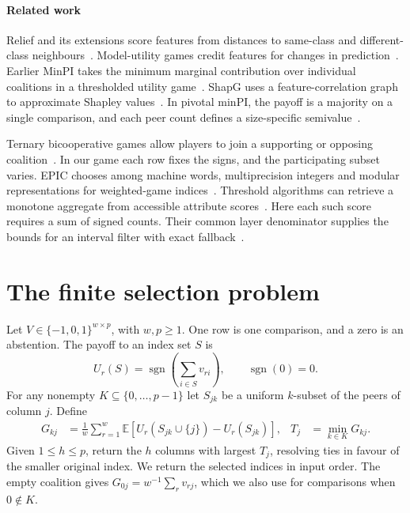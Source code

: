 \documentclass{article}
\DeclareMathOperator{\sgn}{sgn}
\newcommand{\EE}{\mathbb E}
\newcommand{\method}{pivotal minPI}
\begin{document}
\paragraph{Related work}
Relief and its extensions score features from distances to same-class and different-class neighbours~\citep{kira1992relief,robnik2003relieff,sun2010local}. Model-utility games credit features for changes in prediction~\citep{cohen2007feature}. Earlier MinPI takes the minimum marginal contribution over individual coalitions in a thresholded utility game~\citep{shi2026minpi}. ShapG uses a feature-correlation graph to approximate Shapley values~\citep{zhao2025shapg}. In \method{}, the payoff is a majority on a single comparison, and each peer count defines a size-specific semivalue~\citep{dubey1981semivalues}.

Ternary bicooperative games allow players to join a supporting or opposing coalition~\citep{bilbao2010ternary}. In our game each row fixes the signs, and the participating subset varies. EPIC chooses among machine words, multiprecision integers and modular representations for weighted-game indices~\citep{staudacher2021power}. Threshold algorithms can retrieve a monotone aggregate from accessible attribute scores~\citep{fagin2003topk}. Here each such score requires a sum of signed counts. Their common layer denominator supplies the bounds for an interval filter with exact fallback~\citep{shewchuk1997adaptive}.

\section{The finite selection problem}
Let $V\in\{-1,0,1\}^{w\times p}$, with $w,p\ge1$. One row is one comparison, and a zero is an abstention. The payoff to an index set $S$ is
\begin{equation}
 U_r(S)=\sgn\!\left(\sum_{i\in S}v_{ri}\right), \qquad \sgn(0)=0 .\label{eq:game}
\end{equation}
For any nonempty $K\subseteq\{0,\ldots,p-1\}$ let $S_{jk}$ be a uniform $k$-subset of the peers of column $j$. Define
\begin{align}
 G_{kj}&=\frac1w\sum_{r=1}^{w}\EE\!\left[U_r(S_{jk}\cup\{j\})-U_r(S_{jk})\right],
 & T_j&=\min_{k\in K}G_{kj} .\label{eq:score}
\end{align}
Given $1\le h\le p$, return the $h$ columns with largest $T_j$, resolving ties in favour of the smaller original index. We return the selected indices in input order. The empty coalition gives $G_{0j}=w^{-1}\sum_r v_{rj}$, which we also use for comparisons when $0\notin K$.
\end{document}
